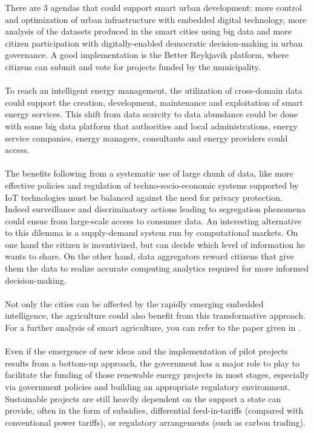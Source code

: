 \documentclass[11pt]{article}
\begin{document}
There are 3 agendas that could support smart urban development: more control and optimization of urban infrastructure with embedded digital technology, more analysis of the datasets produced in the smart cities using big data and more citizen participation with digitally-enabled democratic decision-making in urban governance. A good implementation is the Better Reykjavik platform, where citizens can submit and vote for projects funded by the municipality.\cite{17}\\\\
To reach an intelligent energy management, the utilization of cross-domain data could support the creation, development, maintenance and exploitation of smart energy services. This shift from data scarcity to data abundance could be done with some big data platform that authorities and local administrations, energy service companies, energy managers, consultants and energy providers could access.\cite{18}\cite{19}\\\\
The benefits following from a systematic use of large chunk of data, like more effective policies and regulation of techno-socio-economic systems supported by IoT technologies must be balanced against the need for privacy protection. Indeed surveillance and discriminatory actions leading to segregation phenomena could ensue from large-scale access to consumer data. An interesting alternative to this dilemma is a supply-demand system run by computational markets. On one hand the citizen is incentivized, but can decide which level of information he wants to share. On the other hand, data aggregators reward citizens that give them the data to realize accurate computing analytics required for more informed decision-making.\cite{20}\\\\
Not only the cities can be affected by the rapidly emerging embedded intelligence, the agriculture could also benefit from this transformative approach. For a further analysis of smart agriculture, you can refer to the paper given in \cite{21}.\\\\
Even if the emergence of new ideas and the implementation of pilot projects results from a bottom-up approach, the government has a major role to play to facilitate the funding of those renewable energy projects in most stages, especially via government policies and building an appropriate regulatory environment. Sustainable projects are still heavily dependent on the support a state can provide, often in the form of subsidies, differential feed-in-tariffs (compared with conventional power tariffs), or regulatory arrangements (such as carbon trading).\cite{22}
\end{document}
